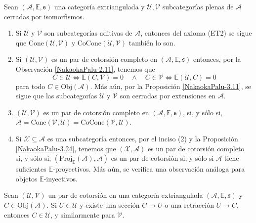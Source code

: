 \documentclass[tesis]{subfiles}
\begin{document}
\begin{Obs}\cite[Remarks 4.3, 4.4, 4.6 \& 4.7]{NakaokaPalu}\label{NakaokaPalu-4.3,4.4,4.6,4.7}

    Sean $(\mathscr{A},\mathbb{E},\mathfrak{s})$ una categoría extriangulada y $\mathcal{U},\mathcal{V}$ subcategorías plenas de $\mathscr{A}$ cerradas por isomorfismos. 
    
    \begin{enumerate}[label=(\arabic*)]
    
        \item Si $\mathcal{U}$ y $\mathcal{V}$ son subcategorías aditivas de $\mathscr{A}$, entonces del axioma (ET2) se sigue que $\text{Cone}(\mathcal{U},\mathcal{V})$ y $\text{CoCone}(\mathcal{U},\mathcal{V})$ también lo son.

        \item Si $(\mathcal{U},\mathcal{V})$ es un par de cotorsión completo en $(\mathscr{A},\mathbb{E},\mathfrak{s})$ entonces, por la Observación \ref{NakaokaPalu-2.11}, tenemos que
            \[
                C\in\mathcal{U} \iff \mathbb{E}(C,\mathcal{V}) = 0 \quad \land \quad C\in\mathcal{V} \iff \mathbb{E}(\mathcal{U},C) = 0
            \] 
            para todo $C\in\text{Obj}(\mathscr{A})$. Más aún, por la Proposición \ref{NakaokaPalu-3.11}, se sigue que las subcategorías $\mathcal{U}$ y $\mathcal{V}$ son cerradas por extensiones en $\mathscr{A}$.

        \item $(\mathcal{U},\mathcal{V})$ es un par de cotorsión completo en $(\mathscr{A},\mathbb{E},\mathfrak{s})$, si, y sólo si, $\mathscr{A} = \text{Cone}(\mathcal{V},\mathcal{U}) = \text{CoCone}(\mathcal{V},\mathcal{U})$.

        \item Si $\mathcal{X}\subseteq\mathscr{A}$ es una subcategoría entonces, por el inciso (2) y la Proposición \ref{NakaokaPalu-3.24}, tenemos que $(\mathcal{X},\mathscr{A})$ es un par de cotorsión completo si, y sólo si, $(\text{Proj}_\mathbb{E}(\mathscr{A}),\mathscr{A})$ es un par de cotorsión si, y sólo si $\mathscr{A}$ tiene suficientes $\mathbb{E}$-proyectivos. Más aún, se verifica una observación análoga para objetos $\mathbb{E}$-inyectivos.
    \end{enumerate}
\end{Obs}

\begin{Coro}\cite[Corollary 4.5]{NakaokaPalu}\label{NakaokaPalu-4.5}
    Sean $(\mathcal{U},\mathcal{V})$ un par de cotorsión en una categoría extriangulada $(\mathscr{A},\mathbb{E},\mathfrak{s})$ y $C\in\text{Obj}(\mathscr{A})$. Si $U\in\mathcal{U}$ y existe una sección $C\to U$ o una retracción $U\to C$, entonces $C\in\mathcal{U}$, y similarmente para $\mathcal{V}$.
\end{Coro}
\end{document}
